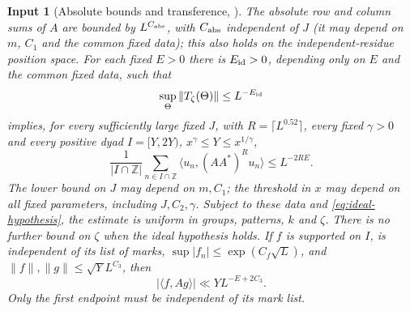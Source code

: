 \documentclass[11pt]{article}
\newtheorem{inputthm}[theorem]{Input}
\theoremstyle{definition}
\newcommand{\Z}{\mathbb Z}
\theoremstyle{remark}
\begin{document}
\begin{inputthm}[Absolute bounds and transference, {\cite[Lemma~3.4,
Theorem~3.5, Corollary~3.11]{WeightedGraphs}}]\label{input:gt}
The absolute row and column sums of $A$ are bounded by $L^{C_{\rm abs}}$,
with $C_{\rm abs}$ independent of $J$ (it may depend on $m$, $C_1$ and the common fixed data); this also holds on the
independent-residue position space.
For each fixed $E>0$ there is $E_{\rm id}>0$, depending only on $E$
and the common fixed data, such that
\begin{equation}\label{eq:ideal-hypothesis}
\sup_\Theta\|T_\zeta(\Theta)\|\le L^{-E_{\rm id}}
\end{equation}
implies, for every sufficiently large fixed $J$, with
$R=\lceil L^{0.52}\rceil$, every fixed $\gamma>0$ and every positive dyad $I=[Y,2Y)$,
$x^\gamma\le Y\le x^{1/\gamma}$,
\begin{equation}\label{eq:source-moment}
\frac1{|I\cap\Z|}\sum_{n\in I\cap\Z}
\langle u_n,(AA^*)^Ru_n\rangle\le L^{-2RE}.
\end{equation}
The lower bound on $J$ may depend on $m,C_1$; the threshold in $x$
may depend on all fixed parameters, including $J,C_2,\gamma$.
Subject to these data and \eqref{eq:ideal-hypothesis}, the estimate
is uniform in groups, patterns, $k$ and $\zeta$.
There is no further bound on $\zeta$ when the ideal hypothesis holds.
If $f$ is supported on $I$, is independent of its list of marks,
$\sup|f_n|\le\exp(C_f\sqrt L)$, and
$\|f\|,\|g\|\le\sqrt Y L^{C_3}$, then
\begin{equation}\label{eq:source-pairing}
|\langle f,Ag\rangle|\ll YL^{-E+2C_3}.
\end{equation}
Only the first endpoint must be independent of its mark list.
\end{inputthm}
\end{document}
